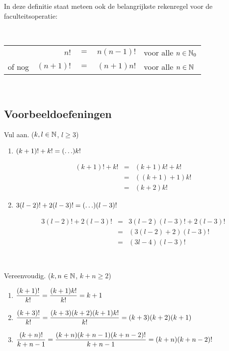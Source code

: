 \documentclass{ximera}
\begin{document}
In deze definitie staat meteen ook de belangrijkste rekenregel
voor de faculteitsoperatie:
\begin{kaderrekenregel}
\mbox{\ }\hfill
\begin{tabular}[t]{lr@{\;}c@{\;}ll}
& $n!$ & $=$ & $n(n-1)!$ & voor alle $n\in\mathbb{N}_0$ \\
of nog & $(n+1)!$ & $=$ & $(n+1)n!$ & voor alle $n\in\mathbb{N}$
\end{tabular}
\hfill\mbox{\ }
\end{kaderrekenregel}

\newpage
\startletternummering
\subsection{Voorbeeldoefeningen}
\begin{voorbeeldoefening}
Vul aan. ($k,l\in\mathbb{N}$, $l\geqslant3$)
\begin{enumerate}
\item $\displaystyle{(k+1)!+k!=(\ldots)k!}$
\begin{oplossing}
\begin{eqnarray*}
(k+1)!+k!&=&(k+1)k!+k!\\
&=&\left((k+1)+1\right)k!\\
&=&(k+2)k!
\end{eqnarray*}
\end{oplossing}
\item $\displaystyle{3(l-2)!+2(l-3)!=(\ldots)(l-3)!}$
\begin{oplossing}
\begin{eqnarray*}
3(l-2)!+2(l-3)!&=&3(l-2)(l-3)!+2(l-3)!\\
&=&\left(3(l-2)+2\right)(l-3)!\\
&=&(3l-4)(l-3)!
\end{eqnarray*}
\end{oplossing}~
\end{enumerate}
\end{voorbeeldoefening}
\begin{voorbeeldoefening}
Vereenvoudig. ($k,n\in\mathbb{N}$, $k+n\geqslant2$)
\begin{enumerate}
\item $\displaystyle{\frac{(k+1)!}{k!}=\frac{(k+1)k!}{k!}=k+1}$
\item $\displaystyle{\frac{(k+3)!}{k!}=\frac{(k+3)(k+2)(k+1)k!}{k!}=(k+3)(k+2)(k+1)}$
\item $\displaystyle{\frac{(k+n)!}{k+n-1}=\frac{(k+n)(k+n-1)(k+n-2)!}{k+n-1}=(k+n)(k+n-2)!}$
\end{enumerate}
\end{voorbeeldoefening}
\eindeletternummering
\end{document}
